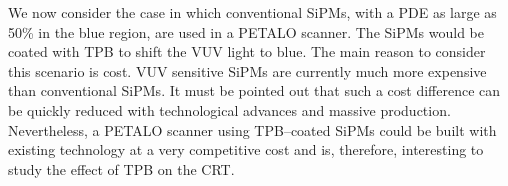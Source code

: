 \documentclass[11pt,a4paper]{article}
\begin{document}
%
%


We now consider the case in which conventional SiPMs, with a PDE as large as 50\% in the blue region, are used in a PETALO scanner. The SiPMs would be coated with TPB to shift the VUV light to blue. The main reason to consider this scenario is cost. VUV sensitive SiPMs are currently much more expensive  than conventional SiPMs. It must be pointed out that such a cost difference can be quickly reduced with technological advances and massive production. Nevertheless, a PETALO scanner using TPB--coated SiPMs could be built with existing technology at a very competitive cost and is, therefore, interesting to study the effect of TPB on the CRT.
\end{document}
